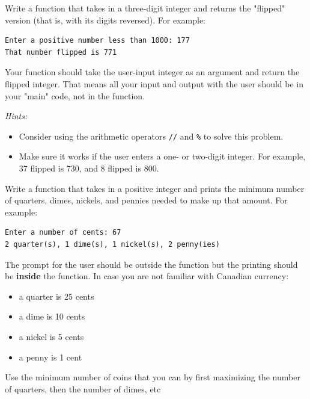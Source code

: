 \documentclass{../pset}
\begin{document}
\begin{problem}
Write a function that takes in a three-digit integer and returns the "flipped" version (that is, with its digits reversed). For example:
 
\begin{lstlisting}[language={}]
Enter a positive number less than 1000: 177
That number flipped is 771
\end{lstlisting}
Your function should take the user-input integer as an argument and return the flipped integer. That means all your input and output with the user should be in your "main" code, not in the function.

\textit{Hints:}
\begin{itemize}
\item  Consider using the arithmetic operators \lstinline|//| and \lstinline|%| to solve this problem.
\item Make sure it works if the user enters a one- or two-digit integer. For example, 37 flipped is 730, and 8 flipped is 800.
\end{itemize}
\end{problem}



\begin{problem}
Write a function that takes in a positive integer and prints the minimum number of quarters, dimes, nickels, and pennies needed to make up that amount.  
For example:
\begin{lstlisting}[language={}]
Enter a number of cents: 67
2 quarter(s), 1 dime(s), 1 nickel(s), 2 penny(ies)
\end{lstlisting}


The prompt for the user should be outside the function but the printing should be \textbf{inside} the function.
In case you are not familiar with Canadian currency: 
\begin{itemize}
\item  a quarter is 25 cents
\item  a dime is 10 cents
\item  a nickel is 5 cents
\item a penny is 1 cent
\end{itemize}
Use the minimum number of coins that you can by first maximizing the number of quarters, then the number of dimes, etc

\end{problem}
\end{document}
